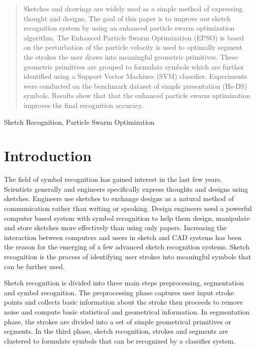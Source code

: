 \documentclass[12pt,1p,times]{elsarticle}%
\begin{document}
\begin{frontmatter}
\begin{abstract}
Sketches and drawings are widely used as a simple method of expressing thought and designs. The goal of this paper is to improve our sketch recognition system by using an enhanced particle swarm optimization algorithm. The Enhanced Particle Swarm Optimization (EPSO) is based on the perturbation of the particle velocity is used to optimally segment the strokes the user draws into meaningful geometric primitives.  These geometric primitives are grouped to formulate symbols which are further identified using a Support Vector Machines (SVM) classifier. Experiments were conducted on the benchmark dataset of simple presentation (Hs-DS) symbols. Results show that that the enhanced particle swarm optimization improves the final recognition accuracy. 

\end{abstract}

\begin{keyword}

Sketch Recognition, Particle Swarm Optimization

\end{keyword}
\end{frontmatter}

 \section{Introduction}

The field of symbol recognition has gained interest in the last few years. Scientists generally and engineers specifically express thoughts and designs using sketches. Engineers use sketches to exchange designs as a natural method of communication rather than writing or speaking. Design engineers need a powerful computer based system with symbol recognition to help them design, manipulate and store sketches more effectively than using only papers. Increasing the interaction between computers and users in sketch and CAD systems has been the reason for the emerging of a few advanced sketch recognition systems. Sketch recognition is the process of identifying user strokes into meaningful symbols that can be further used.  

Sketch recognition is divided into three main steps preprocessing, segmentation and symbol recognition. The preprocessing phase captures user input stroke points and collects basic information about the stroke then proceeds to remove noise and compute basic statistical and geometrical information. In segmentation phase, the strokes are divided into a set of simple geometrical primitives or segments. In the third phase, sketch recognition, strokes and segments are clustered to formulate symbols that can be recognized by a classifier system.
\end{document}
